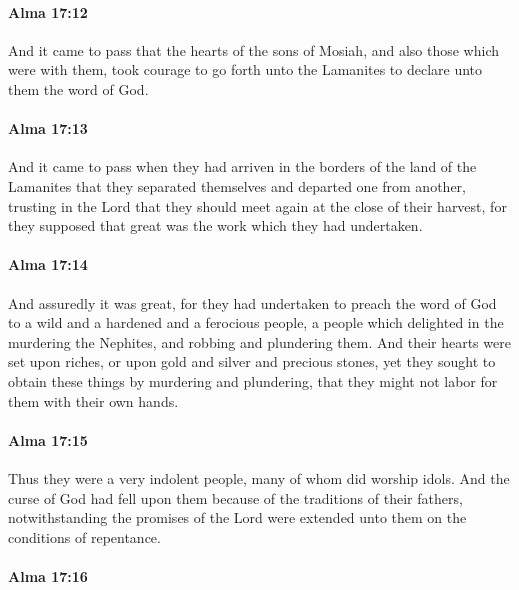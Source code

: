 		\paragraph{Alma 17:12} %
			\label{ALMA-17-12}

			And it came to pass that the hearts of the sons of Mosiah,
			and also those which were with them,
			took courage to go forth unto the Lamanites
			to declare unto them the word of God.

		\paragraph{Alma 17:13} %
			\label{ALMA-17-13}

			And it came to pass
			when they had arriven in the borders of the land of the Lamanites
			that they separated themselves and departed one from another,
			trusting in the Lord that they should meet again at the close of their harvest,
			for they supposed that great was the work which they had undertaken.

		\paragraph{Alma 17:14} %
			\label{ALMA-17-14}

			And assuredly it was great,
			for they had undertaken to preach the word of God
			to a wild and a hardened and a ferocious people,
			a people which delighted in the murdering the Nephites,
			and robbing and plundering them.
			And their hearts were set upon riches,
			or upon gold and silver and precious stones,
			yet they sought to obtain these things by murdering and plundering,
			that they might not labor for them with their own hands.

		\paragraph{Alma 17:15} %
			\label{ALMA-17-15}

			Thus they were a very indolent people,
			many of whom did worship idols.
			And the curse of God had fell upon them because of the traditions of their fathers,
			notwithstanding the promises of the Lord were extended unto them
			on the conditions of repentance.

		\paragraph{Alma 17:16} %
			\label{ALMA-17-16}

